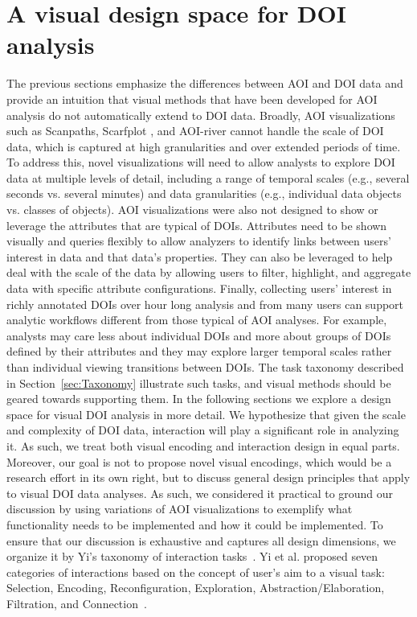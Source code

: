 \section{A visual design space for DOI analysis}
The previous sections emphasize the differences between AOI and DOI data and provide an intuition that visual methods that have been developed for AOI analysis do not automatically extend to DOI data. Broadly, AOI visualizations such as Scanpaths, Scarfplot , and AOI-river cannot handle the scale of DOI data, which is captured at high granularities and over extended periods of time. To address this, novel visualizations will need to allow analysts to explore DOI data at multiple levels of detail, including a range of temporal scales (e.g., several seconds vs. several minutes) and data granularities (e.g., individual data objects vs. classes of objects).  
AOI visualizations were also not designed to show or leverage the attributes that are typical of DOIs.  Attributes need to be shown visually and queries flexibly to allow analyzers to identify links between users' interest in data and that data's properties. They can also be leveraged to help deal with the scale of the data by allowing users to filter, highlight, and aggregate data with specific attribute configurations.
Finally, collecting users' interest in richly annotated DOIs over hour long analysis and from many users can support analytic workflows different from those typical of AOI analyses. For example, analysts may care less about individual DOIs and more about groups of DOIs defined by their attributes and they may explore larger temporal scales rather than individual viewing transitions between DOIs. The task taxonomy described in Section~\ref{sec:Taxonomy} illustrate such tasks, and visual methods should be geared towards supporting them. 
In the following sections we explore a design space for visual DOI analysis in more detail. We hypothesize that given the scale and complexity of DOI data, interaction will play a significant role in analyzing it. As such, we treat both visual encoding and interaction design in equal parts. Moreover, our goal is not to propose novel visual encodings, which would be a research effort in its own right, but to discuss general design principles that apply to visual DOI data analyses. As such, we considered it practical to ground our discussion by using variations of AOI visualizations to exemplify what functionality needs to be implemented and how it could be implemented. 
To ensure that our discussion is exhaustive and captures all design dimensions, we organize it by Yi's taxonomy of interaction tasks~\cite{yi2007toward}. Yi et al. proposed seven categories of interactions based on the concept of user's aim to a visual task: Selection, Encoding, Reconfiguration, Exploration, Abstraction/Elaboration, Filtration, and Connection~\cite{yi2007toward}. 
